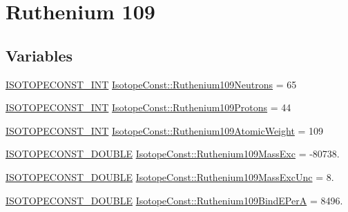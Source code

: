 \hypertarget{group___isotope_const-_ruthenium-_ru109}{}\section{Ruthenium 109}
\label{group___isotope_const-_ruthenium-_ru109}
\subsection*{Variables}
\begin{DoxyCompactItemize}
\item 
\mbox{\hyperlink{group___isotope_const-_macros_ga5f18360b3e99483a35c32d789e62621c}{I\+S\+O\+T\+O\+P\+E\+C\+O\+N\+S\+T\+\_\+\+I\+NT}} \mbox{\hyperlink{group___isotope_const-_ruthenium-_ru109_gae4032028816fb4759f81747c00209ea5}{Isotope\+Const\+::\+Ruthenium109\+Neutrons}} = 65
\item 
\mbox{\hyperlink{group___isotope_const-_macros_ga5f18360b3e99483a35c32d789e62621c}{I\+S\+O\+T\+O\+P\+E\+C\+O\+N\+S\+T\+\_\+\+I\+NT}} \mbox{\hyperlink{group___isotope_const-_ruthenium-_ru109_ga0b5f743c15d16c25f1a87c996a84d3a6}{Isotope\+Const\+::\+Ruthenium109\+Protons}} = 44
\item 
\mbox{\hyperlink{group___isotope_const-_macros_ga5f18360b3e99483a35c32d789e62621c}{I\+S\+O\+T\+O\+P\+E\+C\+O\+N\+S\+T\+\_\+\+I\+NT}} \mbox{\hyperlink{group___isotope_const-_ruthenium-_ru109_gafb52bdb3a581fb20e094b9b9da11c1fb}{Isotope\+Const\+::\+Ruthenium109\+Atomic\+Weight}} = 109
\item 
\mbox{\hyperlink{group___isotope_const-_macros_ga8f45a7272ce02c0b4c65c44636ed719a}{I\+S\+O\+T\+O\+P\+E\+C\+O\+N\+S\+T\+\_\+\+D\+O\+U\+B\+LE}} \mbox{\hyperlink{group___isotope_const-_ruthenium-_ru109_ga37a48e0419c91e9253e1e11feb1bd5c0}{Isotope\+Const\+::\+Ruthenium109\+Mass\+Exc}} = -\/80738.
\item 
\mbox{\hyperlink{group___isotope_const-_macros_ga8f45a7272ce02c0b4c65c44636ed719a}{I\+S\+O\+T\+O\+P\+E\+C\+O\+N\+S\+T\+\_\+\+D\+O\+U\+B\+LE}} \mbox{\hyperlink{group___isotope_const-_ruthenium-_ru109_gab243a2a0f144a6480bc719a3a879042d}{Isotope\+Const\+::\+Ruthenium109\+Mass\+Exc\+Unc}} = 8.
\item 
\mbox{\hyperlink{group___isotope_const-_macros_ga8f45a7272ce02c0b4c65c44636ed719a}{I\+S\+O\+T\+O\+P\+E\+C\+O\+N\+S\+T\+\_\+\+D\+O\+U\+B\+LE}} \mbox{\hyperlink{group___isotope_const-_ruthenium-_ru109_ga02360a813f5cba4c7c8c70fabd355543}{Isotope\+Const\+::\+Ruthenium109\+Bind\+E\+PerA}} = 8496.
\item 

\end{DoxyCompactItemize}
